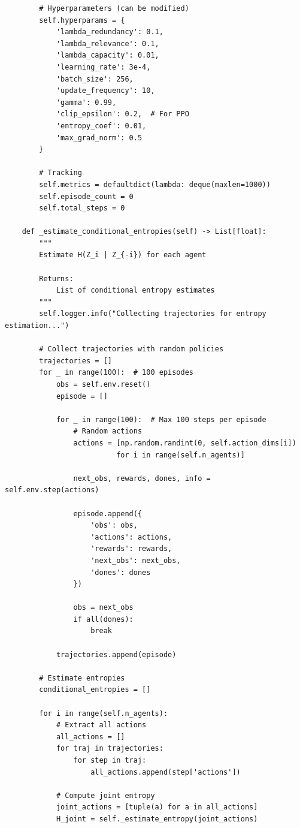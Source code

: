 \documentclass[10pt, letterpaper]{article}
\begin{document}
\begin{lstlisting}
        # Hyperparameters (can be modified)
        self.hyperparams = {
            'lambda_redundancy': 0.1,
            'lambda_relevance': 0.1,
            'lambda_capacity': 0.01,
            'learning_rate': 3e-4,
            'batch_size': 256,
            'update_frequency': 10,
            'gamma': 0.99,
            'clip_epsilon': 0.2,  # For PPO
            'entropy_coef': 0.01,
            'max_grad_norm': 0.5
        }

        # Tracking
        self.metrics = defaultdict(lambda: deque(maxlen=1000))
        self.episode_count = 0
        self.total_steps = 0

    def _estimate_conditional_entropies(self) -> List[float]:
        """
        Estimate H(Z_i | Z_{-i}) for each agent

        Returns:
            List of conditional entropy estimates
        """
        self.logger.info("Collecting trajectories for entropy estimation...")

        # Collect trajectories with random policies
        trajectories = []
        for _ in range(100):  # 100 episodes
            obs = self.env.reset()
            episode = []

            for _ in range(100):  # Max 100 steps per episode
                # Random actions
                actions = [np.random.randint(0, self.action_dims[i])
                          for i in range(self.n_agents)]

                next_obs, rewards, dones, info = self.env.step(actions)

                episode.append({
                    'obs': obs,
                    'actions': actions,
                    'rewards': rewards,
                    'next_obs': next_obs,
                    'dones': dones
                })

                obs = next_obs
                if all(dones):
                    break

            trajectories.append(episode)

        # Estimate entropies
        conditional_entropies = []

        for i in range(self.n_agents):
            # Extract all actions
            all_actions = []
            for traj in trajectories:
                for step in traj:
                    all_actions.append(step['actions'])

            # Compute joint entropy
            joint_actions = [tuple(a) for a in all_actions]
            H_joint = self._estimate_entropy(joint_actions)


\end{lstlisting}
\end{document}
